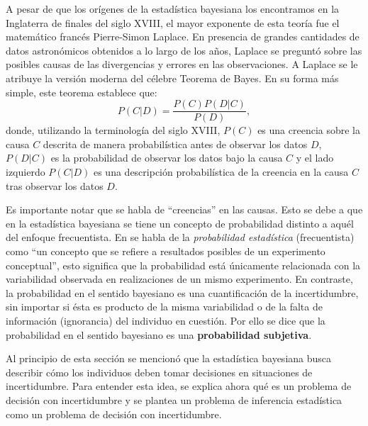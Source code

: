 \documentclass[11pt,a4paper]{article}
\begin{document}
A pesar de que los orígenes de la estadística bayesiana los encontramos en la Inglaterra de finales del siglo XVIII, el mayor exponente de esta teoría fue el matemático francés Pierre-Simon Laplace. En presencia de grandes cantidades de datos astronómicos obtenidos a lo largo de los años, Laplace se preguntó sobre las posibles causas de las divergencias y errores en las observaciones. A Laplace se le atribuye la versión moderna del célebre Teorema de Bayes. En su forma más simple, este teorema establece que:
\begin{equation}
\label{bayes}
P(C|D) = \frac{P(C)P(D|C)}{P(D)},
\end{equation}
donde, utilizando la terminología del siglo XVIII, $P(C)$ es una creencia sobre la causa $C$ descrita de manera probabilística antes de observar los datos $D$, $P(D|C)$ es la probabilidad de observar los datos bajo la causa $C$ y el lado izquierdo $P(C|D)$ es una descripción probabilística de la creencia en la causa $C$ tras observar los datos $D$.

Es importante notar que se habla de ``creencias'' en las causas. Esto se debe a que en la estadística bayesiana se tiene un concepto de probabilidad distinto a aquél del enfoque frecuentista. En \citet{feller} se habla de la \textit{probabilidad estadística} (frecuentista) como ``un concepto que se refiere a resultados posibles de un experimento conceptual'', esto significa que la probabilidad está únicamente relacionada con la variabilidad observada en realizaciones de un mismo experimento. En contraste, la probabilidad en el sentido bayesiano es una cuantificación de la incertidumbre, sin importar si ésta es producto de la misma variabilidad o de la falta de información (ignorancia) del individuo en cuestión. Por ello se dice que la probabilidad en el sentido bayesiano es una \textbf{probabilidad subjetiva}.

Al principio de esta sección se mencionó que la estadística bayesiana busca describir cómo los individuos deben tomar decisiones en situaciones de incertidumbre. Para entender esta idea, se explica ahora qué es un problema de decisión con incertidumbre y se plantea un problema de inferencia estadística como un problema de decisión con incertidumbre.
\end{document}
